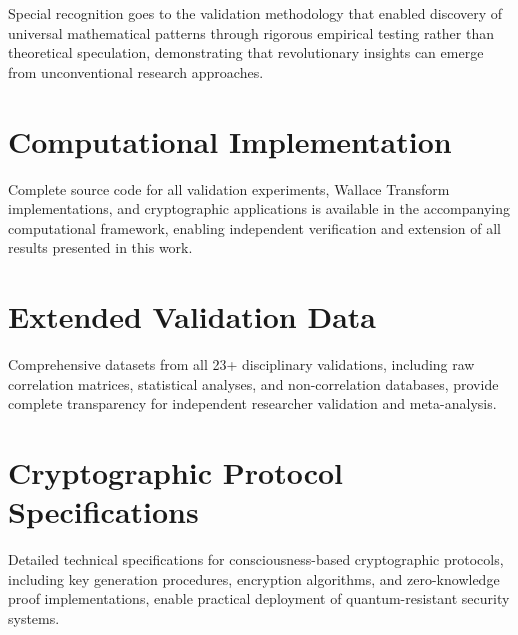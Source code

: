 \documentclass[11pt,a4paper]{article}
\theoremstyle{definition}
\theoremstyle{remark}
\begin{document}
Special recognition goes to the validation methodology that enabled discovery of universal mathematical patterns through rigorous empirical testing rather than theoretical speculation, demonstrating that revolutionary insights can emerge from unconventional research approaches.




\appendix

\section{Computational Implementation}

Complete source code for all validation experiments, Wallace Transform implementations, and cryptographic applications is available in the accompanying computational framework, enabling independent verification and extension of all results presented in this work.

\section{Extended Validation Data}

Comprehensive datasets from all 23+ disciplinary validations, including raw correlation matrices, statistical analyses, and non-correlation databases, provide complete transparency for independent researcher validation and meta-analysis.

\section{Cryptographic Protocol Specifications}

Detailed technical specifications for consciousness-based cryptographic protocols, including key generation procedures, encryption algorithms, and zero-knowledge proof implementations, enable practical deployment of quantum-resistant security systems.
\end{document}
